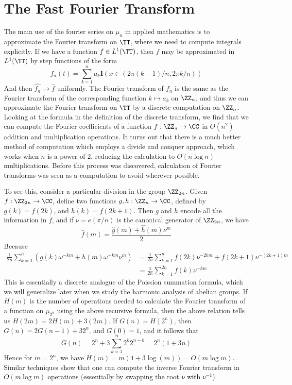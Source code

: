 \section{The Fast Fourier Transform}

The main use of the fourier series on $\mu_n$ in applied mathematics is to approximate the Fourier transform on $\TT$, where we need to compute integrals explicitly. If we have a function $f \in L^1(\TT)$, then $f$ may be approximated in $L^1(\TT)$ by step functions of the form
%
\[ f_n(t) = \sum_{k = 1}^{n} a_k \mathbf{I}(x \in (2 \pi (k-1) / n, 2 \pi k / n)) \]
%
And then $\widehat{f_n} \to \widehat{f}$ uniformly. The Fourier transform of $f_n$ is the same as the Fourier transform of the corresponding function $k \mapsto a_k$ on $\ZZ_n$, and thus we can approximate the Fourier transform on $\TT$ by a discrete computation on $\ZZ_n$. Looking at the formula in the definition of the discrete transform, we find that we can compute the Fourier coefficients of a function $f: \ZZ_n \to \CC$ in $O(n^2)$ addition and multiplication operations. It turns out that there is a much better method of computation which employs a divide and conquer approach, which works when $n$ is a power of 2, reducing the calculation to $O(n \log n)$ multiplications. Before this process was discovered, calculation of Fourier transforms was seen as a computation to avoid wherever possible.

To see this, consider a particular division in the group $\ZZ_{2n}$. Given $f: \ZZ_{2n} \to \CC$, define two functions $g,h: \ZZ_n \to \CC$, defined by $g(k) = f(2k)$, and $h(k) = f(2k + 1)$. Then $g$ and $h$ encode all the information in $f$, and if $\nu = e(\pi/n)$ is the canonical generator of $\ZZ_{2n}$, we have
%
\[ \hat{f}(m) = \frac{\hat{g}(m) + \hat{h}(m) \nu^m}{2} \]
%
Because
%
\begin{align*}
    \frac{1}{2n} \sum_{k = 1}^{n} \left( g(k) \omega^{-km} + h(m) \omega^{-km} \nu^m \right) &= \frac{1}{2n} \sum_{k = 1}^n f(2k) \nu^{-2km} + f(2k + 1) \nu^{-(2k+1)m}\\
    &= \frac{1}{2n} \sum_{k = 1}^{2n} f(k) \nu^{-km}
\end{align*}
%
This is essentially a discrete analogue of the Poission summation formula, which we will generalize later when we study the harmonic analysis of abelian groups. If $H(m)$ is the number of operations needed to calculate the Fourier transform of a function on $\mu_{2^n}$ using the above recursive formula, then the above relation tells us $H(2m) = 2H(m) + 3 (2m)$. If $G(n) = H(2^n)$, then $G(n) = 2G(n-1) + 3 2^n$, and $G(0) = 1$, and it follows that
%
\[ G(n) = 2^n + 3 \sum_{k = 1}^n 2^{k} 2^{n-k} = 2^n(1 + 3n) \]
%
Hence for $m = 2^n$, we have $H(m) = m(1 + 3 \log (m)) = O(m \log m)$. Similar techniques show that one can compute the inverse Fourier transform in $O(m \log m)$ operations (essentially by swapping the root $\nu$ with $\nu^{-1}$).

